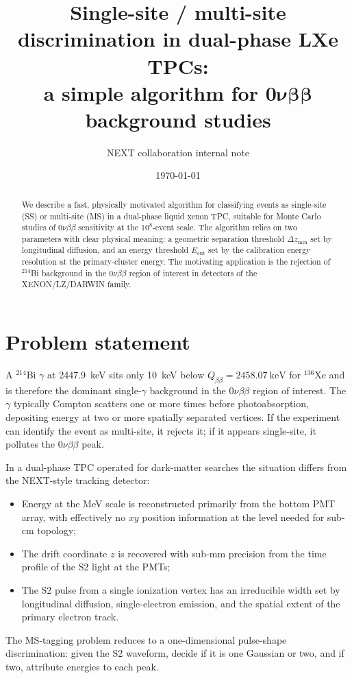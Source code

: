 \documentclass[11pt,a4paper]{article}
\title{Single-site / multi-site discrimination in dual-phase LXe TPCs:\\
       a simple algorithm for $\bm{0\nu\beta\beta}$ background studies}
\author{NEXT collaboration internal note}
\date{\today}
\begin{document}
\maketitle

\begin{abstract}
We describe a fast, physically motivated algorithm for classifying
events as single-site (SS) or multi-site (MS) in a dual-phase liquid
xenon TPC, suitable for Monte Carlo studies of $0\nu\beta\beta$
sensitivity at the $10^{8}$-event scale. The algorithm relies on two
parameters with clear physical meaning: a geometric separation
threshold $\Delta z_{\min}$ set by longitudinal diffusion, and an
energy threshold $E_{\mathrm{cut}}$ set by the calibration energy
resolution at the primary-cluster energy. The motivating application
is the rejection of $^{214}$Bi background in the $0\nu\beta\beta$
region of interest in detectors of the XENON/LZ/DARWIN family.
\end{abstract}

\section{Problem statement}

A $^{214}$Bi $\gamma$ at \SI{2447.9}{\keV} sits only \SI{10}{\keV}
below $Q_{\beta\beta} = \SI{2458.07}{\keV}$ for $^{136}$Xe and is
therefore the dominant single-$\gamma$ background in the
$0\nu\beta\beta$ region of interest. The $\gamma$ typically Compton
scatters one or more times before photoabsorption, depositing energy
at two or more spatially separated vertices. If the experiment can
identify the event as multi-site, it rejects it; if it appears
single-site, it pollutes the $0\nu\beta\beta$ peak.

In a dual-phase TPC operated for dark-matter searches the situation
differs from the NEXT-style tracking detector:
\begin{itemize}
\item Energy at the MeV scale is reconstructed primarily from the
      bottom PMT array, with effectively no $xy$ position information
      at the level needed for sub-cm topology;
\item The drift coordinate $z$ is recovered with sub-mm precision
      from the time profile of the S2 light at the PMTs;
\item The S2 pulse from a single ionization vertex has an irreducible
      width set by longitudinal diffusion, single-electron emission,
      and the spatial extent of the primary electron track.
\end{itemize}
The MS-tagging problem reduces to a one-dimensional pulse-shape
discrimination: given the S2 waveform, decide if it is one Gaussian
or two, and if two, attribute energies to each peak.
\end{document}
